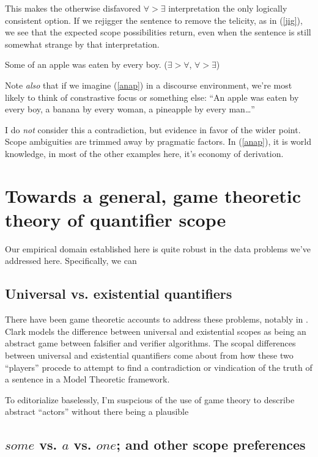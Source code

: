 \documentclass{article}
\begin{document}
This makes the otherwise disfavored $\forall>\exists$ interpretation the only logically consistent option. If we rejigger the sentence to remove the telicity, as in (\ref{jig}), we see that the expected scope possibilities return, even when the sentence is still somewhat strange by that interpretation.

\begin{exe}
\ex Some of an apple was eaten by every boy. \hfill ($\exists>\forall$, $\forall>\exists$)\label{jig}
\end{exe}

Note \emph{also} that if we imagine (\ref{anap}) in a discourse environment, we're most likely to think of constrastive focus or something else: ``An apple was eaten by every boy, a banana by every woman, a pineapple by every man\ldots'' 

I do \emph{not} consider this a contradiction, but evidence in favor of the wider point.
Scope ambiguities are trimmed away by pragmatic factors. In (\ref{anap}), it is world knowledge, in most of the other examples here, it's economy of derivation.

\section{Towards a general, game theoretic theory of quantifier scope}

Our empirical domain established here is quite robust in the data problems we've addressed here.
Specifically, we can

\subsection{Universal vs. existential quantifiers}

There have been game theoretic accounts to address these problems, notably in \textcite{clark12}.
Clark models the difference between universal and existential scopes as being an abstract game between falsifier and verifier algorithms.
The scopal differences between universal and existential quantifiers come about from how these two ``players'' procede to attempt to find a contradiction or vindication of the truth of a sentence in a Model Theoretic framework.

To editorialize baselessly, I'm suspcious of the use of game theory to describe abstract ``actors'' without there being a plausible 

\subsection{$some$ vs. $a$ vs. $one$; and other scope preferences}
\end{document}
